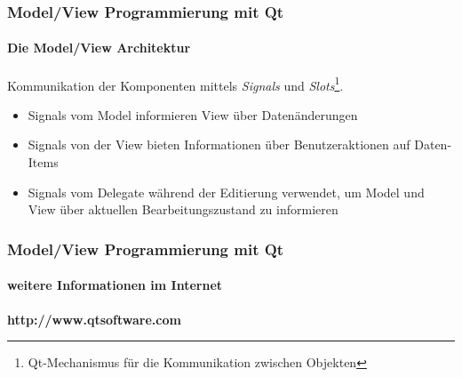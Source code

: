 \begin{frame}
	\frametitle{Model/View Programmierung mit Qt}
	\framesubtitle{Die Model/View Architektur}
	\begin{center}
		{\small Kommunikation der Komponenten mittels {\itshape Signals} und 
			{\itshape Slots}\footnote{Qt-Mechanismus für die Kommunikation zwischen Objekten}.}
	\end{center}
	\begin{itemize}
		\item Signals vom Model informieren View über Datenänderungen
		\item Signals von der View bieten Informationen über Benutzeraktionen auf Daten-Items
		\item Signals vom Delegate während der Editierung verwendet, um Model und View
		über aktuellen Bearbeitungszustand zu informieren
	\end{itemize}
\end{frame}

\begin{frame}
	\frametitle{Model/View Programmierung mit Qt}
	\framesubtitle{weitere Informationen im Internet}
	\begin{center}
		{\Large \bf http://www.qtsoftware.com}
	\end{center}
\end{frame}

